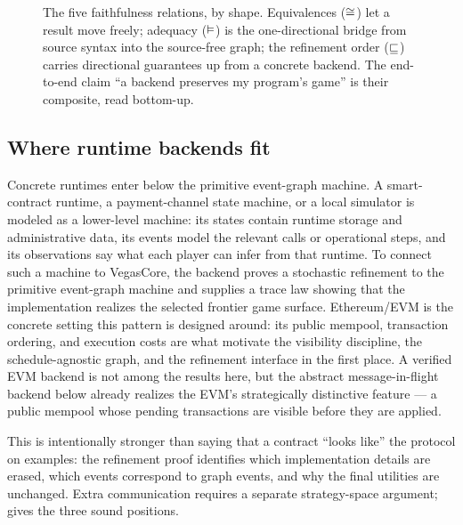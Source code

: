 \begin{figure}[t]
\caption{The five faithfulness relations, by shape.  Equivalences
($\cong$) let a result move freely; adequacy ($\vDash$) is the
one-directional bridge from source syntax into the source-free graph; the
refinement order ($\sqsubseteq$) carries directional guarantees up from a
concrete backend.  The end-to-end claim ``a backend preserves my
program's game'' is their composite, read bottom-up.}
\label{fig:relations}
\end{figure}

\subsection{Where runtime backends fit}
\label{sec:intro:runtime-backends}

Concrete runtimes enter below the primitive event-graph machine.  A
smart-contract runtime, a payment-channel state machine, or a local
simulator is modeled as a lower-level machine: its states contain
runtime storage and administrative data, its events model the relevant
calls or operational steps, and its observations say what each player can
infer from that runtime.  To connect such a machine to VegasCore, the
backend proves a stochastic refinement to the primitive event-graph
machine and supplies a trace law showing that the implementation realizes
the selected frontier game surface.  Ethereum/EVM is the concrete setting
this pattern is designed around: its public mempool, transaction ordering,
and execution costs are what motivate the visibility discipline, the
schedule-agnostic graph, and the refinement interface in the first place.  A
verified EVM backend is not among the results here, but the abstract
message-in-flight backend below already realizes the EVM's strategically
distinctive feature --- a public mempool whose pending transactions are
visible before they are applied.

This is intentionally stronger than saying that a contract ``looks like''
the protocol on examples: the refinement proof identifies which
implementation details are erased, which events correspond to graph
events, and why the final utilities are unchanged.  Extra communication
requires a separate strategy-space argument; 
gives the three sound positions.

